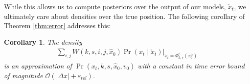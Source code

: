 \documentclass[letterpaper,10pt,conference]{ieeeconf}
\newtheorem{cor}{Corollary}
\begin{document}
While this allows us to compute posteriors over the output of our models, $\check{x}_t$, we ultimately care about densities over the true position.
The following corollary of Theorem \ref{thm:error} addresses this:
\begin{cor} \label{cor:error}
	The density
	\begin{align}
		\sum_{i,j} W(k,s,i,j,\hat{x}_0) \left. \Pr( x_t \mid \check{x}_t ) \right|_{ \check{x}_t = \Phi_{k,s}^t( x_0^\alpha) } \label{eq:approximation 2}
	\end{align}
	is an approximation of $\Pr( x_t, k, s, \hat{x}_0, \hat{v}_0)$ with a constant in time error bound of magnitude $\mathcal{O}( |\Delta x| + \varepsilon_{tol} )$.
\end{cor}
\end{document}
